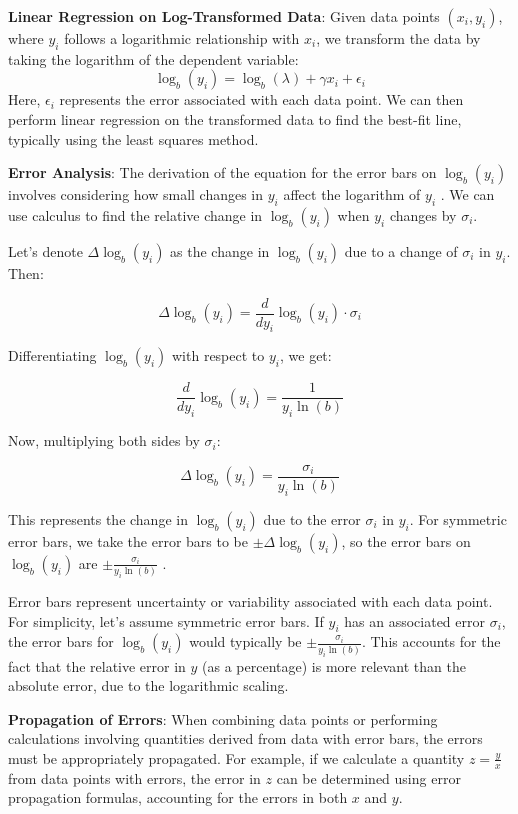 \documentclass{article}
\begin{document}
\textbf{Linear Regression on Log-Transformed Data}:
Given data points $(x_i, y_i)$, where $y_i$ follows a logarithmic relationship with $x_i$, we transform the data by taking the logarithm of the dependent variable:
     \[ \log_b(y_i) = \log_b(\lambda) + \gamma x_i + \epsilon_i \]
Here, $\epsilon_i$ represents the error associated with each data point. We can then perform linear regression on the transformed data to find the best-fit line, typically using the least squares method.

\textbf{Error Analysis}:
The derivation of the equation for the error bars on $\log_b(y_i)$ involves considering how small changes in $y_i$ affect the logarithm of $y_i$ \cite{stewart2010calculus}\cite{taylor2022introduction}\cite{press2007numerical}. We can use calculus to find the relative change in $\log_b(y_i)$ when $y_i$ changes by $\sigma_i$.

Let's denote $\Delta \log_b(y_i)$ as the change in $\log_b(y_i)$ due to a change of $\sigma_i$ in $y_i$. Then:

\[
\Delta \log_b(y_i) = \frac{d}{dy_i} \log_b(y_i) \cdot \sigma_i
\]

Differentiating $\log_b(y_i)$ with respect to $y_i$, we get:

\[
\frac{d}{dy_i} \log_b(y_i) = \frac{1}{y_i \ln(b)}
\]

Now, multiplying both sides by $\sigma_i$:

\[
\Delta \log_b(y_i) = \frac{\sigma_i}{y_i \ln(b)}
\]

This represents the change in $\log_b(y_i)$ due to the error $\sigma_i$ in $y_i$. For symmetric error bars, we take the error bars to be $\pm \Delta \log_b(y_i)$, so the error bars on $\log_b(y_i)$ are $\pm \frac{\sigma_i}{{y_i \ln(b)}}$ \cite{taylor2022introduction}\cite{bevington2003data}\cite{press2007numerical}.

Error bars represent uncertainty or variability associated with each data point. For simplicity, let's assume symmetric error bars. If $y_i$ has an associated error $\sigma_i$, the error bars for $\log_b(y_i)$ would typically be $\pm \frac{\sigma_i}{{y_i \ln(b)}}$. This accounts for the fact that the relative error in $y$ (as a percentage) is more relevant than the absolute error, due to the logarithmic scaling\cite{taylor2022introduction}\cite{bevington2003data}\cite{press2007numerical}.

\textbf{Propagation of Errors}:
When combining data points or performing calculations involving quantities derived from data with error bars, the errors must be appropriately propagated. For example, if we calculate a quantity $z = \frac{y}{x}$ from data points with errors, the error in $z$ can be determined using error propagation formulas, accounting for the errors in both $x$ and $y$.
\end{document}
